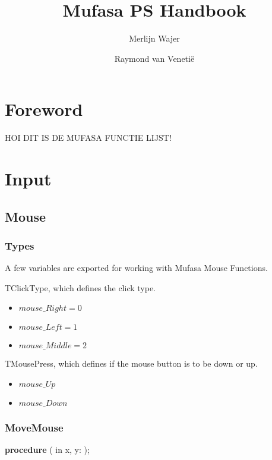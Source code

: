 \documentclass[a4paper]{report}
\begin{document}
\title{Mufasa PS Handbook}
\author{Merlijn Wajer \and Raymond van Veneti\"{e}}


\maketitle
\tableofcontents

\chapter{Foreword}

HOI DIT IS DE MUFASA FUNCTIE LIJST!

\chapter{Input}

\section{Mouse}

\subsection{Types}

A few variables are exported for working with Mufasa Mouse Functions.

TClickType, which defines the click type.
\begin{itemize}
	\item $mouse\_Right = 0$ 
	\item $mouse\_Left = 1$
	\item $mouse\_Middle = 2$
\end{itemize}

TMousePress, which defines if the mouse button is to be down or up.
\begin{itemize}
	\item $mouse\_Up$
	\item $mouse\_Down$
\end{itemize}


\subsection{MoveMouse}
\textbf{procedure} {\color{blue}{MoveMouse}}({\color{typeRed}
{in x, y: }}{\color{typeGreen}{Integer}});
\end{document}
